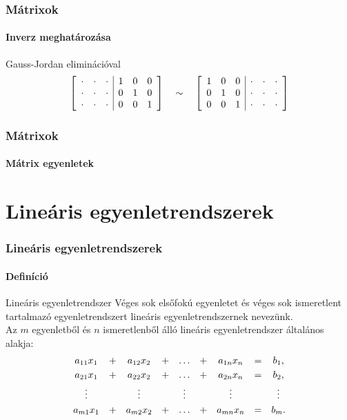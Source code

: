 \documentclass[xcolor={table}]{beamer}
\begin{document}
\begin{frame}
  \frametitle{Mátrixok}
  \framesubtitle{Inverz meghatározása}

  \vfill

  \begin{block}{Gauss-Jordan eliminációval}
    \[
      \left[\begin{array}{*{3}{>{\cdot}{c}}|*{3}c}
           &  &  & 1 & 0 & 0 \\
           &  &  & 0 & 1 & 0 \\
           &  &  & 0 & 0 & 1 \\
        \end{array}\right]
      \quad \sim \quad
      \left[\begin{array}{*{3}{c}|*{3}{>{\cdot}{c}}}
          1 & 0 & 0 &  &  & \\
          0 & 1 & 0 &  &  & \\
          0 & 0 & 1 &  &  & \\
        \end{array}\right]
    \]
  \end{block}

  \vfill

  

  \vfill
\end{frame}

\begin{frame}
  \frametitle{Mátrixok}
  \framesubtitle{Mátrix egyenletek}

  
\end{frame}

\section{Lineáris egyenletrendszerek}
\begin{frame}
  \frametitle{Lineáris egyenletrendszerek}
  \framesubtitle{Definíció}

  \begin{block}{Lineáris egyenletrendszer}
    Véges sok elsőfokú egyenletet és véges sok ismeretlent tartalmazó
    egyenletrendszert lineáris egyenletrendszernek nevezünk.
    \\[2mm]
    Az $m$ egyenletből és $n$ ismeretlenből álló lineáris egyenletrendszer
    általános alakja:
    \[
      \begin{array}{*{9}{c}}
        a_{11} x_{1} & + & a_{12} x_{2} & + & \dots  & + & a_{1n} x_{n} & = & b_{1}\text, \\[1mm]
        a_{21} x_{1} & + & a_{22} x_{2} & + & \dots  & + & a_{2n} x_{n} & = & b_{2}\text, \\[1mm]
        \vdots       &   & \vdots       &   & \vdots &   & \vdots       &   & \vdots      \\[1mm]
        a_{m1} x_{1} & + & a_{m2} x_{2} & + & \dots  & + & a_{mn} x_{n} & = & b_{m}\text.
      \end{array}
    \]
  \end{block}
\end{frame}
\end{document}
